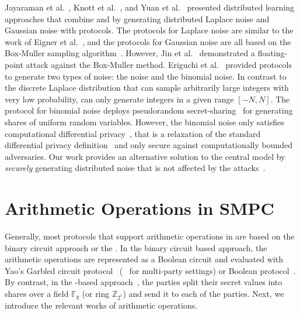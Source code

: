 Jayaraman et al.~\cite{jayaraman2018distributed}, Knott et al.~\cite{knott2021crypten}, and Yuan et al.~\cite{yuan2021practical} presented distributed learning approaches that combine \smpc and \differentialprivacy by generating distributed Laplace noise and Gaussian noise with \smpc protocols. The protocols for Laplace noise are similar to the work of Eigner et al.~\cite{eigner2014differentially}, and the protocols for Gaussian noise are all based on the Box-Muller sampling algorithm~\cite{box1958note}. However, Jin et al.~\cite{jin2022we} demonstrated a floating-point attack against the Box-Muller method.
Eriguchi et al.~\cite{eriguchi2021efficient} provided \smpc protocols to generate two types of noise: the \fdl noise and the binomial noise. In contrast to the discrete Laplace distribution that can sample arbitrarily large integers with very low probability, \fdl can only generate integers in a given range $\left[-N,N\right] $. The protocol for binomial noise deploys pseudorandom secret-sharing~\cite{cramer2005share} for generating shares of uniform random variables. However, the binomial noise only satisfies computational differential privacy~\cite{mironov2009computational}, that is a relaxation of the standard differential privacy definition~\cite{dwork2014algorithmic} and only secure against computationally bounded adversaries.
Our work provides an alternative solution to the central \differentialprivacy model by \textit{securely} generating distributed noise that is not affected by the attacks~\cite{mironov2012significance,jin2022we}.


\section{Arithmetic Operations in SMPC}
\label{ArithmeticOperationsinSMPC}

Generally, most \smpc protocols that support arithmetic operations in \smpc are based on the binary circuit approach or the \lsss. In the binary circuit based approach, the arithmetic operations are represented as a Boolean circuit and evaluated with Yao's Garbled circuit protocol~\cite{yao1986generate} (\bmr~\cite{beaver1990round} for multi-party settings) or Boolean \gmw protocol~\cite{goldreich1987play}.
By contrast, in the \lsss-based approach~\cite{chaum1988multiparty,ben1988completeness}, the parties split their secret values into shares over a field $\mathbb{F} _q$ (or ring $\mathbb{Z} _{2^{\ell}}$) and send it to each of the parties. Next, we introduce the relevant works of arithmetic operations.

